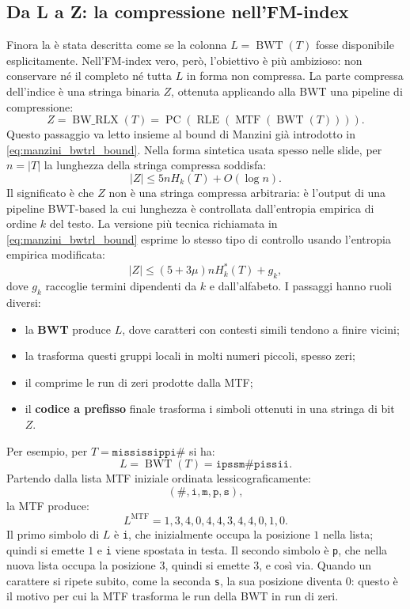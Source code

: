 \documentclass{article}
\theoremstyle{definition}
\numberwithin{equation}{section}
\begin{document}
\subsection{Da L a Z: la compressione nell'FM-index}
Finora la  è stata descritta come se la colonna $L=\operatorname{BWT}(T)$ fosse disponibile esplicitamente. Nell'FM-index vero, però, l'obiettivo è più ambizioso: non conservare né il  completo né tutta $L$ in forma non compressa. La parte compressa dell'indice è una stringa binaria $Z$, ottenuta applicando alla BWT una pipeline di compressione:
\[
    Z
    =
    \operatorname{BW\_RLX}(T)
    =
    \operatorname{PC}(
    \operatorname{RLE}(
    \operatorname{MTF}(
    \operatorname{BWT}(T)))).
\]
Questo passaggio va letto insieme al bound di Manzini già introdotto in \eqref{eq:manzini_bwtrl_bound}. Nella forma sintetica usata spesso nelle slide, per $n=|T|$ la lunghezza della stringa compressa soddisfa:
\[
    |Z|
    \leq
    5nH_k(T)+O(\log n).
\]
Il significato è che $Z$ non è una stringa compressa arbitraria: è l'output di una pipeline BWT-based la cui lunghezza è controllata dall'entropia empirica di ordine $k$ del testo. La versione più tecnica richiamata in \eqref{eq:manzini_bwtrl_bound} esprime lo stesso tipo di controllo usando l'entropia empirica modificata:
\[
    |Z|
    \leq
    (5+3\mu)nH_k^*(T)+g_k,
\]
dove $g_k$ raccoglie termini dipendenti da $k$ e dall'alfabeto.
I passaggi hanno ruoli diversi:
\begin{itemize}
    \item la \textbf{BWT} produce $L$, dove caratteri con contesti simili tendono a finire vicini;
    \item la \textbf{} trasforma questi gruppi locali in molti numeri piccoli, spesso zeri;
    \item il \textbf{} comprime le run di zeri prodotte dalla MTF;
    \item il \textbf{codice a prefisso} finale trasforma i simboli ottenuti in una stringa di bit $Z$.
\end{itemize}

Per esempio, per $T=\texttt{mississippi\#}$ si ha:
\[
    L=\operatorname{BWT}(T)=\texttt{ipssm\#pissii}.
\]
Partendo dalla lista MTF iniziale ordinata lessicograficamente:
\[
    (\texttt{\#},\texttt{i},\texttt{m},\texttt{p},\texttt{s}),
\]
la MTF produce:
\[
    L^{\operatorname{MTF}}
    =
    1,3,4,0,4,4,3,4,4,0,1,0.
\]
Il primo simbolo di $L$ è \texttt{i}, che inizialmente occupa la posizione $1$ nella lista; quindi si emette $1$ e \texttt{i} viene spostata in testa. Il secondo simbolo è \texttt{p}, che nella nuova lista occupa la posizione $3$, quindi si emette $3$, e così via. Quando un carattere si ripete subito, come la seconda \texttt{s}, la sua posizione diventa $0$: questo è il motivo per cui la MTF trasforma le run della BWT in run di zeri.
\end{document}
